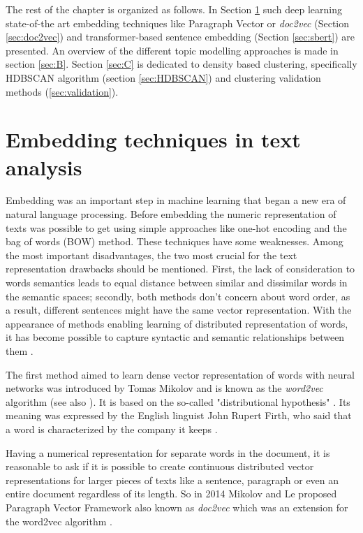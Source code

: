 \documentclass[fontsize=12pt,a4paper,twoside,openany]{scrbook}
\begin{document}
The rest of the chapter is organized as follows. In Section \ref{sec:A} such deep learning state-of-the art embedding techniques like Paragraph Vector or \emph{doc2vec} (Section \ref{sec:doc2vec}) and transformer-based sentence embedding (Section \ref{sec:sbert}) are presented. An overview of the different topic modelling approaches is made in section \ref{sec:B}. Section \ref{sec:C} is dedicated to density based clustering, specifically HDBSCAN algorithm (section \ref{sec:HDBSCAN}) and clustering validation methods (\ref{sec:validation}).  

\section{Embedding techniques in text analysis}
\label{sec:A}

Embedding was an important step in machine learning that began a new era of  natural language processing. Before embedding the numeric representation of texts was possible to get using simple approaches like one-hot encoding and the bag of words (BOW) method. These techniques have some weaknesses. Among the most important disadvantages, the two most crucial for the text representation drawbacks should be mentioned. First, the lack of consideration to words semantics leads to equal distance between similar and dissimilar words in the semantic spaces; secondly, both methods don't concern about word order,  as a result, different sentences might have the same vector representation. With the appearance of methods enabling learning of distributed representation of words, it has become possible to capture syntactic and semantic relationships between them \parencite{Le14}. 

The first method aimed to learn dense vector representation of words with neural networks was introduced by Tomas Mikolov \parencite{TMikolov13} and is known as the \emph{word2vec} algorithm (see also \parencite{Mikolov13}). It is based on the so-called "distributional hypothesis" \parencite{Harris54}. Its meaning was expressed by the English linguist John Rupert Firth, who said  that a word is characterized by the company it keeps \parencite{Firth57}.

Having a numerical representation for separate words in the document, it is reasonable to ask if it is possible to create continuous distributed vector representations for larger pieces of texts like a sentence, paragraph or even an entire document regardless of its length. So in 2014 Mikolov and Le proposed Paragraph Vector Framework also known as \emph{doc2vec} which was an extension for the word2vec algorithm \parencite[see][]{Le14}.
\end{document}
